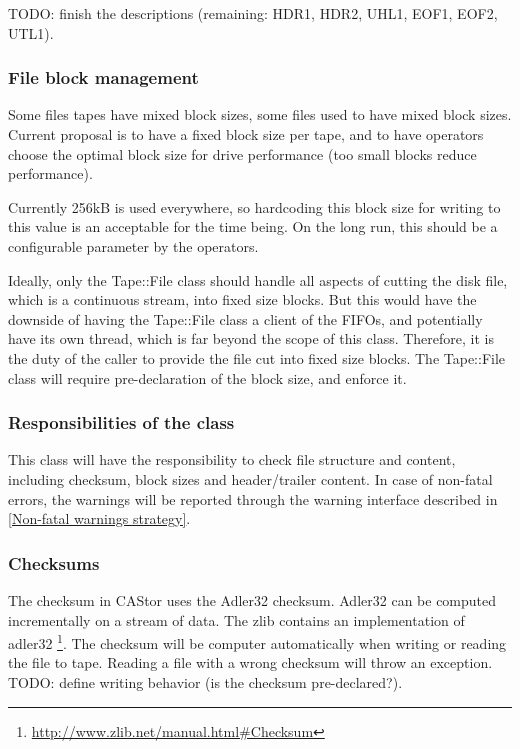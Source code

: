 TODO: finish the descriptions (remaining: HDR1, HDR2, UHL1, EOF1, EOF2, UTL1).

\subsubsection{File block management}

Some files tapes have mixed block sizes,
some files used to have mixed block sizes. Current proposal is to have a fixed
block size per tape, and to have operators choose the optimal block size for 
drive performance (too small blocks reduce performance). 

Currently 256kB is used everywhere, so hardcoding this block size for writing 
to this value is an acceptable for the time being. On the long run, this should 
be a configurable parameter by the operators.

Ideally, only the Tape::File class should handle all aspects of cutting the disk
file, which is a continuous stream, into fixed size blocks. But this would have the 
downside of having the Tape::File class a client of the FIFOs, and potentially 
have its own thread, which is far beyond the scope of this class. Therefore, it 
is the duty of the caller to provide the file cut into fixed size blocks.
The Tape::File class will require pre-declaration of the block size, and 
enforce it.

\subsubsection{Responsibilities of the class}
This class will have the responsibility to check file structure and content,
including checksum, block sizes and header/trailer content. In case of non-fatal
errors, the warnings will be reported through the warning interface described in
\ref{Non-fatal warnings strategy}.

\subsubsection{Checksums}
The checksum in CAStor uses the Adler32 checksum. Adler32 can be computed 
incrementally on a stream of data. The zlib contains an implementation of adler32
\footnote{\href{http://www.zlib.net/manual.html\#Checksum}{http://www.zlib.net/manual.html\#Checksum}}.
The checksum will be computer automatically when writing or reading the file to
tape. Reading a file with a wrong checksum will throw an exception.
TODO: define writing behavior (is the checksum pre-declared?).

